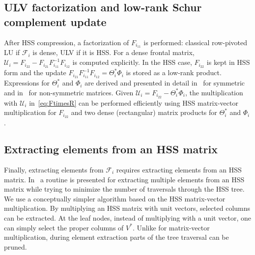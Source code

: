 \documentclass{article}
\begin{document}
\subsection{ULV factorization and low-rank Schur complement update}\label{sec:HSSfact_lowrank_Schur}
After HSS compression, a factorization of $F_{i_{11}}$ is performed:
classical row-pivoted LU if $\mathcal{F}_i$ is dense, ULV if it is
HSS.
For a dense frontal matrix, $\mathcal{U}_i = F_{i_{22}} - F_{i_{21}}
F_{i_{11}}^{-1} F_{i_{12}}$ is computed explicitly.  In the HSS case,
$F_{i_{22}}$ is kept in HSS form and the update $F_{i_{21}}
F_{i_{11}}^{-1} F_{i_{12}} = \Theta^*_i \Phi_i$ is stored as a
low-rank product. Expressions for $\Theta^*_i$ and $\Phi_i$ are
derived and presented in detail in~\cite{xia2013randomized} for
symmetric and in~\cite{xia2012superfast} for non-symmetric matrices.
Given $\mathcal{U}_i = F_{i_{22}} - \Theta^*_i \Phi_i$, the
multiplication with $\mathcal{U}_i$ in~\eqref{eq:FtimesR} can be
performed efficiently using HSS matrix-vector multiplication
for $F_{i_{22}}$ and two dense (rectangular) matrix products for
$\Theta^*_i$ and $\Phi_i$.

\subsection{Extracting elements from an HSS matrix}\label{sec:HSS_extraction}
Finally, extracting elements from $\mathcal{F}_i$ requires extracting
elements from an HSS matrix. In~\cite{xia2013randomized} a routine is
presented for extracting multiple elements from an HSS matrix while
trying to minimize the number of traversals through the HSS tree. We
use a conceptually simpler algorithm based on the HSS matrix-vector
multiplication.
By multiplying an HSS matrix with unit vectors, selected columns can
be extracted. At the leaf nodes, instead of multiplying with a unit
vector, one can simply select the proper columns of $V^*$. Unlike for
matrix-vector multiplication, during element extraction parts of the
tree traversal can be pruned.
\end{document}
